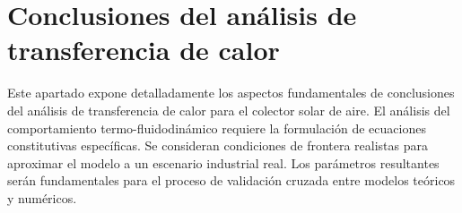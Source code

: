 \section{Conclusiones del análisis de transferencia de calor}
\label{sec:cap10_conclusiones_transferencia}

Este apartado expone detalladamente los aspectos fundamentales de conclusiones del análisis de transferencia de calor para el colector solar de aire.
El análisis del comportamiento termo-fluidodinámico requiere la formulación de ecuaciones constitutivas específicas.
Se consideran condiciones de frontera realistas para aproximar el modelo a un escenario industrial real.
Los parámetros resultantes serán fundamentales para el proceso de validación cruzada entre modelos teóricos y numéricos.
